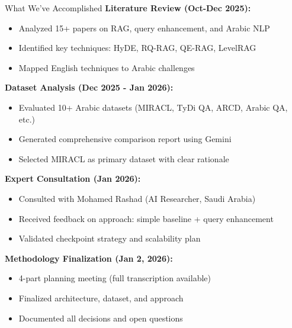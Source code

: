 \documentclass[aspectratio=169]{beamer}
\begin{document}
\begin{frame}{What We've Accomplished}
\textbf{Literature Review (Oct-Dec 2025):}
\begin{itemize}
    \item Analyzed 15+ papers on RAG, query enhancement, and Arabic NLP
    \item Identified key techniques: HyDE, RQ-RAG, QE-RAG, LevelRAG
    \item Mapped English techniques to Arabic challenges
\end{itemize}

\vspace{0.3cm}

\textbf{Dataset Analysis (Dec 2025 - Jan 2026):}
\begin{itemize}
    \item Evaluated 10+ Arabic datasets (MIRACL, TyDi QA, ARCD, Arabic QA, etc.)
    \item Generated comprehensive comparison report using Gemini
    \item Selected MIRACL as primary dataset with clear rationale
\end{itemize}

\vspace{0.3cm}

\textbf{Expert Consultation (Jan 2026):}
\begin{itemize}
    \item Consulted with Mohamed Rashad (AI Researcher, Saudi Arabia)
    \item Received feedback on approach: simple baseline + query enhancement
    \item Validated checkpoint strategy and scalability plan
\end{itemize}

\vspace{0.3cm}

\textbf{Methodology Finalization (Jan 2, 2026):}
\begin{itemize}
    \item 4-part planning meeting (full transcription available)
    \item Finalized architecture, dataset, and approach
    \item Documented all decisions and open questions
\end{itemize}
\end{frame}
\end{document}

